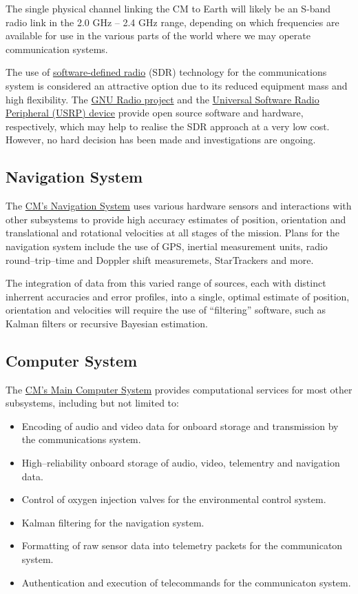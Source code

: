 \documentclass{report}
\begin{document}
The single physical channel linking the CM to Earth will likely be an S-band radio link in the 2.0 GHz -- 2.4 GHz range, depending on which frequencies are available for use in the various parts of the world where we may operate communication systems.

The use of \href{http://en.wikipedia.org/wiki/Software_defined_radio}{software-defined radio} (SDR) technology for the communications system is considered an attractive option due to its reduced equipment mass and high flexibility.  The \href{http://gnuradio.org/redmine/wiki/gnuradio}{GNU Radio project} and the \href{http://www.ettus.com/products}{Universal Software Radio Peripheral (USRP) device} provide open source software and hardware, respectively, which may help to realise the SDR approach at a very low cost.  However, no hard decision has been made and investigations are ongoing.

\subsection{Navigation System}

The \href{http://cstart.org/wiki/CLLARE_CM_Navigation_System}{CM's Navigation System} uses various hardware sensors and interactions with other subsystems to provide high accuracy estimates of position, orientation and translational and rotational velocities at all stages of the mission.  Plans for the navigation system include the use of GPS, inertial measurement units, radio round--trip--time and Doppler shift measuremets, StarTrackers and more.

The integration of data from this varied range of sources, each with distinct inherrent accuracies and error profiles, into a single, optimal estimate of position, orientation and velocities will require the use of ``filtering'' software, such as Kalman filters or recursive Bayesian estimation.

\subsection{Computer System}

The \href{http://cstart.org/wiki/CLLARE_Main_Computer_System}{CM's Main Computer System} provides computational services for most other subsystems, including but not limited to:
\begin{itemize}
\item Encoding of audio and video data for onboard storage and transmission by the communications system.
\item High--reliability onboard storage of audio, video, telementry and navigation data.
\item Control of oxygen injection valves for the environmental control system.
\item Kalman filtering for the navigation system.
\item Formatting of raw sensor data into telemetry packets for the communicaton system.
\item Authentication and execution of telecommands for the communicaton system.
\end{itemize}
\end{document}
